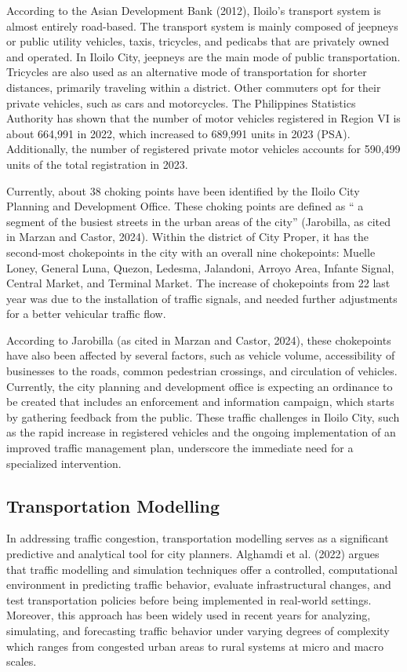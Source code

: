 According to the Asian Development Bank (2012), Iloilo's transport system is almost entirely road-based. The transport system is mainly composed of jeepneys or public utility vehicles, taxis, tricycles, and pedicabs that are privately owned and operated. In Iloilo City, jeepneys are the main mode of public transportation. Tricycles are also used as an alternative mode of transportation for shorter distances, primarily traveling within a district. Other commuters opt for their private vehicles, such as cars and motorcycles. The Philippines Statistics Authority has shown that the number of motor vehicles registered in Region VI is about 664,991 in 2022, which increased to 689,991 units in 2023 (PSA). Additionally, the number of registered private motor vehicles accounts for 590,499 units of the total registration in 2023.

Currently, about 38 choking points have been identified by the Iloilo City Planning and Development Office. These choking points are defined as “ a segment of the busiest streets in the urban areas of the city” (Jarobilla, as cited in Marzan and Castor, 2024). Within the district of City Proper, it has the second-most chokepoints in the city with an overall nine chokepoints: Muelle Loney, General Luna, Quezon, Ledesma, Jalandoni, Arroyo Area, Infante Signal, Central Market, and Terminal Market. The increase of chokepoints from 22 last year was due to the installation of traffic signals, and needed further adjustments for a better vehicular traffic flow.

According to Jarobilla (as cited in Marzan and Castor, 2024), these chokepoints have also been affected by several factors, such as vehicle volume, accessibility of businesses to the roads, common pedestrian crossings, and circulation of vehicles. Currently, the city planning and development office is expecting an ordinance to be created that includes an enforcement and information campaign, which starts by gathering feedback from the public. These traffic challenges in Iloilo City, such as the rapid increase in registered vehicles and the ongoing implementation of an improved traffic management plan, underscore the immediate need for a specialized intervention.

\subsection{Transportation Modelling}
\label{sec:transportation_modelling}

In addressing traffic congestion, transportation modelling serves as a significant predictive and analytical tool for city planners. Alghamdi et al. (2022) argues that traffic modelling and simulation techniques offer a controlled, computational environment in predicting traffic behavior, evaluate infrastructural changes, and test transportation policies before being implemented in real-world settings. Moreover, this approach has been widely used in recent years for analyzing, simulating, and forecasting traffic behavior under varying degrees of complexity which ranges from congested urban areas to rural systems at micro and macro scales.

